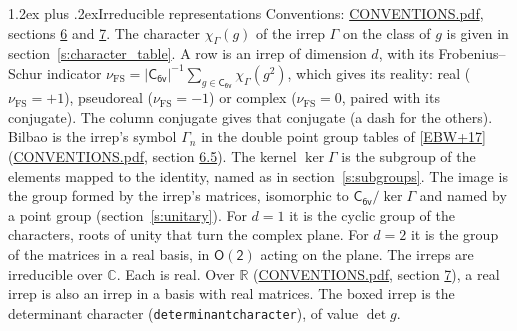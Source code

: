 \documentclass[10pt,a4paper]{article}
\makeatletter
\renewcommand\section{\@startsection{section}{1}{\z@}{-3ex plus -1ex minus -.2ex}%
  {1.2ex plus .2ex}{\normalfont\large\sffamily\bfseries\color{parttitle}}}
\numberwithin{equation}{section}
\newcommand{\grp}[1]{\mathsf{#1}}
\newcommand{\irchar}[1]{\chi_{#1}}
\newcommand{\fsind}{\nu_{\mathrm{FS}}}
\makeatother
\begin{document}
\section{Irreducible representations}\label{s:irreps}
Conventions: \href{../../CONVENTIONS.pdf}{CONVENTIONS.pdf}, sections \href{../../CONVENTIONS.pdf\#conv.6}{6} and \href{../../CONVENTIONS.pdf\#conv.7}{7}.
\leavevmode\label{n:function.character}\label{n:irrep.Gamma}The character $\irchar{\Gamma}(g)$ of the irrep $\Gamma$ on the class of $g$ is given in section~\ref{s:character_table}.
\leavevmode\label{n:index.dimension}\label{n:index.frobenius}\label{n:head.irrep}\label{n:head.reality}A row is an irrep of dimension $d$, with its Frobenius--Schur indicator $\fsind = |\grp{C_{6v}}|^{-1}\allowbreak\sum_{g\in\grp{C_{6v}}}\irchar{\Gamma}(g^2)$, which gives its reality: real ($\fsind = +1$), pseudoreal ($\fsind = -1$) or complex ($\fsind = 0$, paired with its conjugate). \label{n:head.conjugate}The column conjugate gives that conjugate (a dash for the others). \label{n:head.bilbao}\label{n:irrep.alias.gamma}Bilbao is the irrep's symbol $\Gamma_n$ in the double point group tables of [\href{../../../REFERENCES.pdf\#ref.EBW+17}{EBW+17}] (\href{../../CONVENTIONS.pdf}{CONVENTIONS.pdf}, section \href{../../CONVENTIONS.pdf\#conv.6.5}{6.5}). \label{n:head.kernel}The kernel $\ker\Gamma$ is the subgroup of the elements mapped to the identity, named as in section~\ref{s:subgroups}. \label{n:head.image}The image is the group formed by the irrep's matrices, isomorphic to $\grp{C_{6v}}/\ker\Gamma$ and named by a point group (section~\ref{s:unitary}). For $d = 1$ it is the cyclic group of the characters, roots of unity that turn the complex plane. For $d = 2$ it is the group of the matrices in a real basis, in $\grp{O(2)}$ acting on the plane. The irreps are irreducible over $\mathbb{C}$. Each is real. Over $\mathbb{R}$ (\href{../../CONVENTIONS.pdf}{CONVENTIONS.pdf}, section \href{../../CONVENTIONS.pdf\#conv.7}{7}), a real irrep is also an irrep in a basis with real matrices. \label{n:mark.determinant}The boxed irrep is the determinant character (\texttt{determinantcharacter}), of value $\det g$.
\setlength{\emergencystretch}{2em}\par\setlength{\emergencystretch}{0pt}
\end{document}
